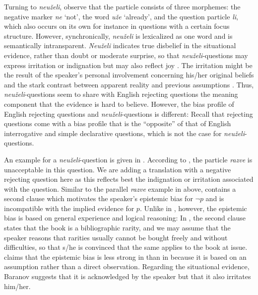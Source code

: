 \documentclass[output=paper,colorlinks,citecolor=brown]{langscibook}
\begin{document}
Turning to \textit{neuželi}, observe that the particle consists of three morphemes: the negative marker \textit{ne} `not', the word \textit{uže} `already', and the question particle \textit{li}, which also occurs on its own for instance in questions with a certain focus structure. However, synchronically, \textit{neuželi} is lexicalized as one word and is semantically intransparent. \textit{Neuželi} indicates true disbelief in the situational evidence, rather than doubt or moderate surprise, so that \textit{neuželi}-questions may express irritation or indignation but may also reflect joy \citep{apresjan80, kirschbaum01, matko14}. The irritation might be the result of the speaker's personal involvement concerning his/her original beliefs and the stark contrast between apparent reality and previous assumptions \citep{rathmayr85}. Thus, \textit{neuželi}-questions seem to share with English rejecting questions the meaning component that the evidence is hard to believe. However, the bias profile of English rejecting questions and \textit{neuželi}-questions is different: Recall that rejecting questions come with a bias profile that is the ``opposite'' of that of English interrogative and simple declarative questions, which is not the case for \textit{neuželi}-questions.

An example for a \textit{neuželi}-question is given in  \citep[126]{baranov86}. According to \citet[126]{baranov86}, the particle \textit{razve} is unacceptable in this question. We are adding a translation with a negative rejecting question here as this reflects best the indignation or irritation associated with the question. Similar to the parallel \textit{razve} example in  above,  contains a second clause which motivates the speaker's epistemic bias for $\neg p$ and is incompatible with the implied evidence for $p$. Unlike in , however, the epistemic bias is based on general experience and logical reasoning: In , the second clause states that the book is a bibliographic rarity, and we may assume that the speaker reasons that rarities usually cannot be bought freely and without difficulties, so that s/he is convinced that the same applies to the book at issue. \citet{baranov86} claims that the epistemic bias is less strong in  than in  because it is based on an assumption rather than a direct observation. Regarding the situational evidence, Baranov suggests that it is acknowledged by the speaker but that it also irritates him/her.
\end{document}
